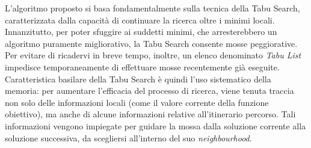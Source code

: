 L'algoritmo proposto si basa fondamentalmente sulla tecnica della Tabu Search, caratterizzata dalla capacità di continuare la ricerca oltre i minimi locali.
Innanzitutto, per poter sfuggire ai suddetti minimi, che arresterebbero un
algoritmo puramente migliorativo, la Tabu Search consente mosse peggiorative.
Per evitare di ricadervi in breve tempo, inoltre, un elenco denominato
\emph{Tabu List} impedisce temporaneamente di effettuare mosse recentemente già eseguite.
Caratteristica basilare della Tabu Search è quindi l'uso sistematico della
memoria: per aumentare l'efficacia del processo di ricerca, viene tenuta traccia non solo delle informazioni locali 
(come il valore corrente della funzione obiettivo), ma anche di alcune informazioni relative all'itinerario percorso. 
Tali informazioni vengono impiegate per guidare la mossa dalla soluzione corrente alla soluzione successiva, 
da scegliersi all'interno del suo \emph{neighbourhood}.

